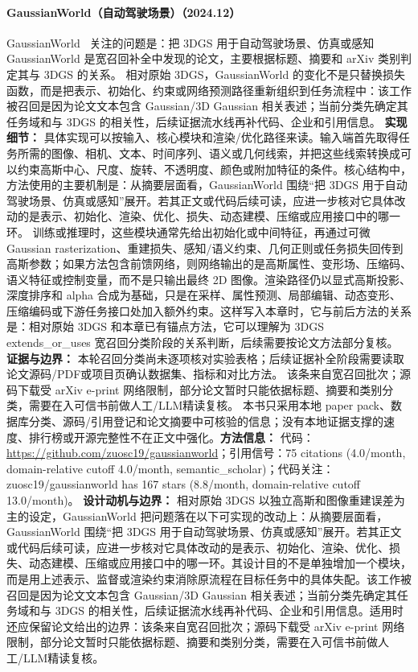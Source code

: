 \paragraph{GaussianWorld（自动驾驶场景）（2024.12）}
GaussianWorld~\cite{2412_10373} 关注的问题是：把 3DGS 用于自动驾驶场景、仿真或感知 GaussianWorld 是宽召回补全中发现的论文，主要根据标题、摘要和 arXiv 类别判定其与 3DGS 的关系。
相对原始 3DGS，GaussianWorld 的变化不是只替换损失函数，而是把表示、初始化、约束或网络预测路径重新组织到任务流程中：该工作被召回是因为论文文本包含 Gaussian/3D Gaussian 相关表述；当前分类先确定其任务域和与 3DGS 的相关性，后续证据流水线再补代码、企业和引用信息。
\textbf{实现细节：} 具体实现可以按输入、核心模块和渲染/优化路径来读。输入端首先取得任务所需的图像、相机、文本、时间序列、语义或几何线索，并把这些线索转换成可以约束高斯中心、尺度、旋转、不透明度、颜色或附加特征的条件。核心结构中，方法使用的主要机制是：从摘要层面看，GaussianWorld 围绕“把 3DGS 用于自动驾驶场景、仿真或感知”展开。若其正文或代码后续可读，应进一步核对它具体改动的是表示、初始化、渲染、优化、损失、动态建模、压缩或应用接口中的哪一环。 训练或推理时，这些模块通常先给出初始化或中间特征，再通过可微 Gaussian rasterization、重建损失、感知/语义约束、几何正则或任务损失回传到高斯参数；如果方法包含前馈网络，则网络输出的是高斯属性、变形场、压缩码、语义特征或控制变量，而不是只输出最终 2D 图像。渲染路径仍以显式高斯投影、深度排序和 alpha 合成为基础，只是在采样、属性预测、局部编辑、动态变形、压缩编码或下游任务接口处加入额外约束。这样写入本章时，它与前后方法的关系是：相对原始 3DGS 和本章已有锚点方法，它可以理解为 3DGS extends\_or\_uses 宽召回分类阶段的关系判断，后续需要按论文方法部分复核。
\textbf{证据与边界：} 本轮召回分类尚未逐项核对实验表格；后续证据补全阶段需要读取论文源码/PDF或项目页确认数据集、指标和对比方法。 该条来自宽召回批次；源码下载受 arXiv e-print 网络限制，部分论文暂时只能依据标题、摘要和类别分类，需要在入可信书前做人工/LLM精读复核。 本书只采用本地 paper pack、数据库分类、源码/引用登记和论文摘要中可核验的信息；没有本地证据支撑的速度、排行榜或开源完整性不在正文中强化。\textbf{方法信息：} 代码：\url{https://github.com/zuosc19/gaussianworld}；引用信号：75 citations (4.0/month, domain-relative cutoff 4.0/month, semantic\_scholar)；代码关注：zuosc19/gaussianworld has 167 stars (8.8/month, domain-relative cutoff 13.0/month)。
\textbf{设计动机与边界：} 相对原始 3DGS 以独立高斯和图像重建误差为主的设定，GaussianWorld 把问题落在以下可实现的改动上：从摘要层面看，GaussianWorld 围绕“把 3DGS 用于自动驾驶场景、仿真或感知”展开。若其正文或代码后续可读，应进一步核对它具体改动的是表示、初始化、渲染、优化、损失、动态建模、压缩或应用接口中的哪一环。其设计目的不是单独增加一个模块，而是用上述表示、监督或渲染约束消除原流程在目标任务中的具体失配。该工作被召回是因为论文文本包含 Gaussian/3D Gaussian 相关表述；当前分类先确定其任务域和与 3DGS 的相关性，后续证据流水线再补代码、企业和引用信息。适用时还应保留论文给出的边界：该条来自宽召回批次；源码下载受 arXiv e-print 网络限制，部分论文暂时只能依据标题、摘要和类别分类，需要在入可信书前做人工/LLM精读复核。
